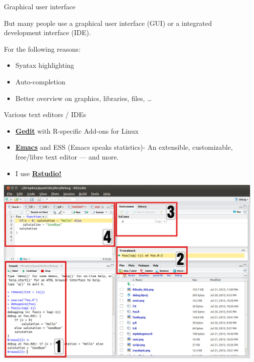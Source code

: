 \documentclass[
  10pt,
  ignorenonframetext,
]{beamer}
\providecommand{\tightlist}{%
  \setlength{\itemsep}{0pt}\setlength{\parskip}{0pt}}
\begin{document}
\begin{frame}{Graphical user interface}
\protect\hypertarget{graphical-user-interface}{}

But many people use a graphical user interface (GUI) or a integrated
development interface (IDE).

For the following reasons:

\begin{itemize}
\tightlist
\item
  Syntax highlighting
\item
  Auto-completion
\item
  Better overview on graphics, libraries, files, \ldots{}
\end{itemize}

\end{frame}

\begin{frame}{Various text editors / IDEs}
\protect\hypertarget{various-text-editors-ides}{}

\begin{itemize}
\item
  \href{https://projects.gnome.org/gedit/}{\textbf{Gedit}} with
  R-specific Add-ons for Linux
\item
  \href{http://www.gnu.org/software/emacs/}{\textbf{Emacs}} and ESS
  (Emacs speaks statistics)- An extensible, customizable, free/libre
  text editor --- and more.
\item
  I use \href{https://www.rstudio.com/}{\textbf{Rstudio!}}
\end{itemize}

\includegraphics{figure/0_overall.jpg}

\end{frame}
\end{document}
